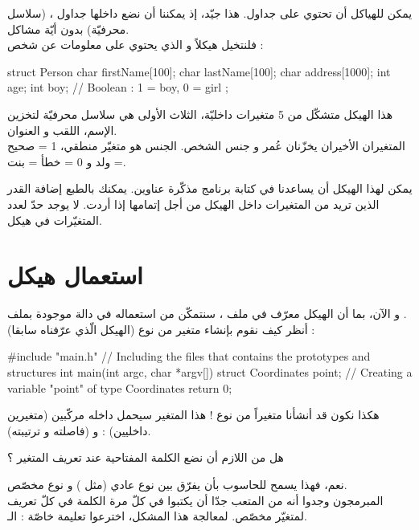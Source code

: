 يمكن للهياكل أن تحتوي على جداول. هذا جيّد، إذ يمكننا أن نضع داخلها جداول
،
(سلاسل محرفيّة) بدون أيّة مشاكل.\\
فلنتخيل هيكلاً
و الذي يحتوي على معلومات عن شخص :

\begin{Csource}
struct Person
{
	char firstName[100];
	char lastName[100];
	char address[1000];
	int age;
	int boy; // Boolean : 1 = boy, 0 = girl
};
\end{Csource}

هذا الهيكل متشكّل من 5 متغيرات داخليّة، الثلاث الأولى هي سلاسل محرفيّة لتخزين الإسم، اللقب و العنوان.\\
المتغيران الأخيران يخزّنان عُمر و جنس الشخص. الجنس هو متغيّر منطقي، 1 = صحيح = ولد و 0 = خطأ = بنت.

يمكن لهذا الهيكل أن يساعدنا في كتابة برنامج مذكّرة عناوين. يمكنك بالطبع إضافة القدر الذين تريد من المتغيرات داخل الهيكل من أجل إتمامها إذا أردت. لا يوجد حدّ لعدد المتغيّرات في هيكل.

\section{استعمال هيكل}

و الآن، بما أن الهيكل معرّف في ملف
،
سنتمكّن من استعماله في دالة موجودة بملف
.\\
أنظر كيف نقوم بإنشاء متغير من نوع
(الهيكل الّذي عرّفناه سابقا) :
\begin{Csource}
#include "main.h" // Including the files that contains the prototypes and structures
int main(int argc, char *argv[])
{
	struct Coordinates point; // Creating a variable "point" of type Coordinates
	return 0;
}
\end{Csource}
هكذا نكون قد أنشأنا متغيراً
من نوع
 !
هذا المتغير سيحمل داخله مركّبين (متغيرين داخليين) :
و
(فاصلته و ترتيبته).

\begin{question}
  هل من اللازم أن نضع الكلمة المفتاحية
عند تعريف المتغير ؟
\end{question}

نعم، فهذا يسمح للحاسوب بأن يفرّق بين نوع عادي (مثل
)
و نوع مخصّص.\\
المبرمجون وجدوا أنه من المتعب جدّا أن يكتبوا في كلّ مرة الكلمة
في كلّ تعريف لمتغيّر مخصّص.
لمعالجة هذا المشكل، اخترعوا تعليمة خاصّة : الـ.

